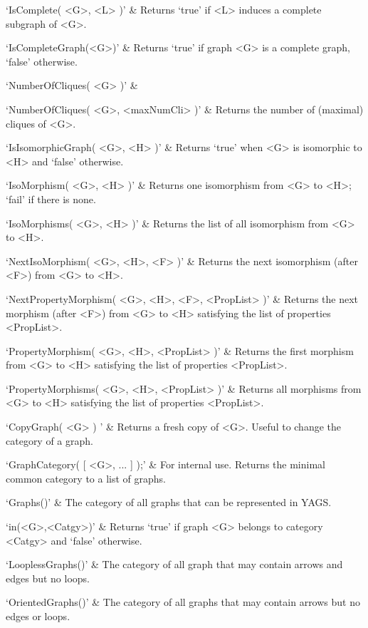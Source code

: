 `IsComplete( <G>, <L> )' & 
Returns `true' if <L> induces a complete subgraph of <G>.

`IsCompleteGraph(<G>)' & 
Returns  `true'  if graph <G> is a complete graph, `false' otherwise.

`NumberOfCliques( <G> )' & 

`NumberOfCliques( <G>, <maxNumCli> )' & 
Returns  the  number of (maximal) cliques of <G>.
\enditems


\beginitems
`IsIsomorphicGraph( <G>, <H> )' & 
Returns `true' when <G> is isomorphic to <H> and `false' otherwise.

`IsoMorphism( <G>, <H> )' & 
Returns one isomorphism from <G> to <H>; `fail' if there is none.

`IsoMorphisms( <G>, <H> )' & 
Returns  the  list  of  all  isomorphism  from  <G> to <H>.

`NextIsoMorphism( <G>, <H>, <F> )' & 
Returns the next isomorphism  (after <F>) from <G> to <H>.

`NextPropertyMorphism( <G>, <H>, <F>, <PropList> )' & 
Returns the next morphism (after <F>) from <G> to <H> satisfying  the  list  of  properties  <PropList>.

`PropertyMorphism( <G>, <H>, <PropList> )' & 
Returns  the  first  morphism from <G> to <H> satisfying the list of properties <PropList>.

`PropertyMorphisms( <G>, <H>, <PropList> )' & 
Returns all morphisms from <G> to <H> satisfying the list of properties <PropList>.
\enditems


\beginitems
`CopyGraph( <G> ) ' & 
Returns a fresh copy of <G>. Useful to change the category of a graph.

`GraphCategory( [ <G>, ... ] );' & 
For internal use. Returns the minimal common category to a list of graphs.

`Graphs()' & 
The category of all  graphs  that  can  be  represented in YAGS.

`in(<G>,<Catgy>)' & 
Returns  `true'  if  graph  <G>  belongs  to  category <Catgy> and `false' otherwise.

`LooplessGraphs()' & 
The category of all graph that may contain arrows and edges but no loops.

`OrientedGraphs()' & 
The category of all graphs that may contain arrows but no edges or loops.

